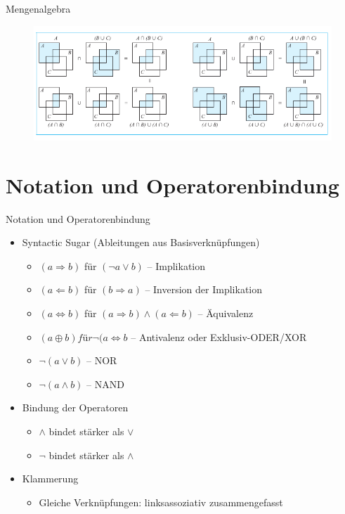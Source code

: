 \documentclass[12pt%
,aspectratio=169%
]{beamer}
\begin{document}
\begin{frame}{Mengenalgebra}
\begin{figure}
	\center
	\includegraphics[scale=0.6]{pictures/menge2}
\end{figure}
\end{frame}

\section{Notation und Operatorenbindung}
\begin{frame}{Notation und Operatorenbindung}
\begin{itemize}
	\item Syntactic Sugar (Ableitungen aus Basisverknüpfungen)
	\begin{itemize}
		\item $(a \Rightarrow b)$ für $(\neg a \lor b)$ -- Implikation
		\item $(a \Leftarrow b)$ für $(b \Rightarrow a)$ -- Inversion der Implikation
		\item $(a \Leftrightarrow b)$ für $(a \Rightarrow b) \land (a \Leftarrow b)$ -- Äquivalenz
		\item $(a \oplus b)  für ¬(a \Leftrightarrow b$ -- Antivalenz oder Exklusiv-ODER/XOR
		\item $\neg(a \lor b)$ -- NOR
		\item $\neg (a \land b)$ -- NAND
	\end{itemize}
	\item Bindung der Operatoren 
	\begin{itemize}
		\item $\land$ bindet stärker als $\lor$
		\item $\neg$ bindet stärker als $\land$
	\end{itemize}
	\item Klammerung
	\begin{itemize}
		\item Gleiche Verknüpfungen: linksassoziativ zusammengefasst
	\end{itemize}
\end{itemize}	 
\end{frame}
\end{document}
